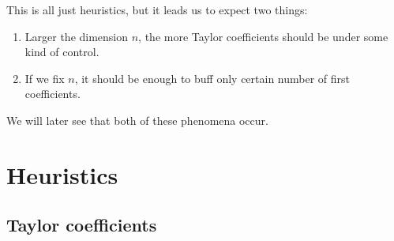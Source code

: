 This is all just heuristics, but it leads us to expect two things:

\begin{enumerate}
	\item Larger the dimension $n$, the more Taylor coefficients should be under some kind of control.
	\item If we fix $n$, it should be enough to buff only certain number of first coefficients.
\end{enumerate}

We will later see that both of these phenomena occur.

\section{Heuristics}

\subsection{Taylor coefficients}

